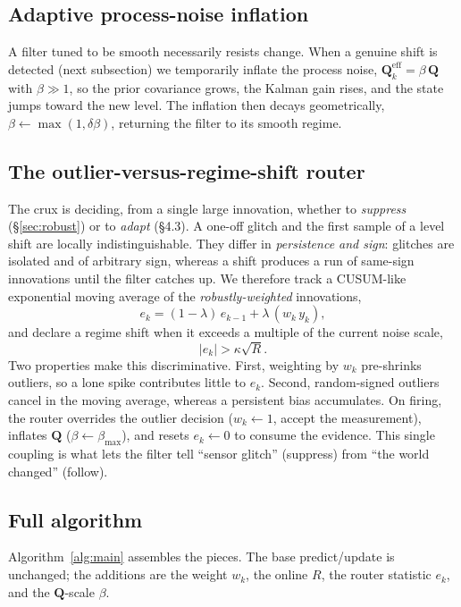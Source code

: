 \documentclass[10pt,twocolumn]{article}
\newcommand{\mQ}{\mathbf{Q}}
\newcommand{\Rmeas}{R}
\begin{document}
\subsection{Adaptive process-noise inflation}
A filter tuned to be smooth necessarily resists change. When a genuine shift is
detected (next subsection) we temporarily inflate the process noise,
$\mQ^{\mathrm{eff}}_k = \beta\,\mQ$ with $\beta \gg 1$, so the prior covariance
grows, the Kalman gain rises, and the state jumps toward the new level. The
inflation then decays geometrically, $\beta \leftarrow \max(1, \delta\beta)$,
returning the filter to its smooth regime.

\subsection{The outlier-versus-regime-shift router}
\label{sec:router}
The crux is deciding, from a single large innovation, whether to \emph{suppress}
(\S\ref{sec:robust}) or to \emph{adapt} (\S4.3). A one-off glitch and the first
sample of a level shift are locally indistinguishable. They differ in
\emph{persistence and sign}: glitches are isolated and of arbitrary sign, whereas
a shift produces a run of same-sign innovations until the filter catches up. We
therefore track a CUSUM-like exponential moving average of the
\emph{robustly-weighted} innovations,
\begin{equation}
e_k = (1-\lambda)\,e_{k-1} + \lambda\,(w_k\,y_k),
\end{equation}
and declare a regime shift when it exceeds a multiple of the current noise scale,
\begin{equation}
|e_k| > \kappa \sqrt{\Rmeas}.
\end{equation}
Two properties make this discriminative. First, weighting by $w_k$ pre-shrinks
outliers, so a lone spike contributes little to $e_k$. Second, random-signed
outliers cancel in the moving average, whereas a persistent bias accumulates. On
firing, the router overrides the outlier decision ($w_k \!\leftarrow\! 1$, accept
the measurement), inflates $\mQ$ ($\beta \!\leftarrow\! \beta_{\max}$), and resets
$e_k \!\leftarrow\! 0$ to consume the evidence. This single coupling is what lets
the filter tell ``sensor glitch'' (suppress) from ``the world changed'' (follow).

\subsection{Full algorithm}
Algorithm~\ref{alg:main} assembles the pieces. The base predict/update is
unchanged; the additions are the weight $w_k$, the online $\Rmeas$, the router
statistic $e_k$, and the $\mQ$-scale $\beta$.
\end{document}
